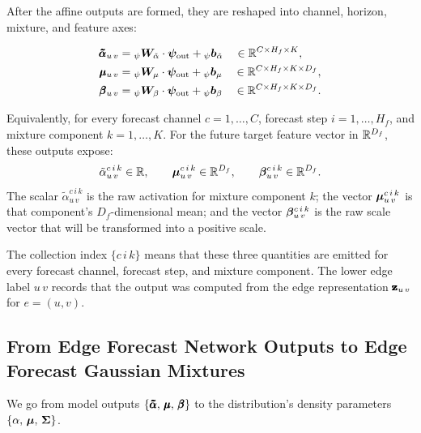 After the affine outputs are formed, they are reshaped into channel, horizon,
mixture, and feature axes:

\[
  \begin{aligned}
    \pmb{\mathbf{\tilde{\alpha}}}_{u\,v}
    &=
    {}_{\psi}\bm{W}_{\tilde{\alpha}}\cdot\bm{\psi}_{\mathrm{out}}
    +
    {}_{\psi}\bm{b}_{\tilde{\alpha}}
    \quad \in \mathbb{R}^{C \times H_f \times K},\\
    \pmb{\mathbf{\mu}}_{u\,v}
    &=
    {}_{\psi}\bm{W}_{\mu}\cdot\bm{\psi}_{\mathrm{out}}
    +
    {}_{\psi}\bm{b}_{\mu}
    \quad \in \mathbb{R}^{C \times H_f \times K \times D_f},\\
    \pmb{\mathbf{\beta}}_{u\,v}
    &=
    {}_{\psi}\bm{W}_{\beta}\cdot\bm{\psi}_{\mathrm{out}}
    +
    {}_{\psi}\bm{b}_{\beta}
    \quad \in \mathbb{R}^{C \times H_f \times K \times D_f}.
  \end{aligned}
\]

Equivalently, for every forecast channel $c=1,\ldots,C$, forecast step
$i=1,\ldots,H_f$, and mixture component $k=1,\ldots,K$.  For the future target feature vector in
$\mathbb{R}^{D_f}$, these outputs expose:
\[
  \tilde{\alpha}_{u\,v}^{c\,i\,k}\in\mathbb{R},
  \qquad
  \bm{\mu}_{u\,v}^{c\,i\,k}\in\mathbb{R}^{D_f},
  \qquad
  \bm{\beta}_{u\,v}^{c\,i\,k}\in\mathbb{R}^{D_f}.
\]
The scalar
$\tilde{\alpha}_{u\,v}^{c\,i\,k}$ is the raw activation for mixture component
$k$; the vector $\bm{\mu}_{u\,v}^{c\,i\,k}$ is that component's
$D_f$-dimensional mean; and the vector $\bm{\beta}_{u\,v}^{c\,i\,k}$ is the
raw scale vector that will be transformed into a positive scale.

The collection index $\{c\,i\,k\}$ means that these three quantities are emitted
for every forecast channel, forecast step, and mixture component.  The lower
edge label ${u\,v}$ records that the output was computed from the edge
representation $\pmb{\mathbf{z}}_{u\,v}$ for $e=(u,v)$.







\subsection{From Edge Forecast Network Outputs to Edge Forecast Gaussian Mixtures}
\label{subsec:from-mdn-to-mixtures}

We go from model outputs 
$\{\pmb{\mathbf{\tilde{\alpha}}},\,\pmb{\mathbf{\mu}},\,\pmb{\mathbf{\beta}}\}$
to the distribution's density parameters $\{\alpha,\,\bm{\mu},\,\bm{\Sigma}\}$.

